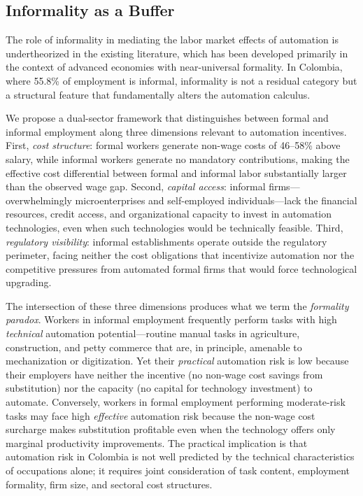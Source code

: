 \documentclass{article}
\begin{document}
\subsection{Informality as a Buffer}
\label{subsec:informality_theory}

The role of informality in mediating the labor market effects of automation is undertheorized in the existing literature, which has been developed primarily in the context of advanced economies with near-universal formality. In Colombia, where 55.8\% of employment is informal, informality is not a residual category but a structural feature that fundamentally alters the automation calculus.

We propose a dual-sector framework that distinguishes between formal and informal employment along three dimensions relevant to automation incentives. First, \textit{cost structure}: formal workers generate non-wage costs of 46--58\% above salary, while informal workers generate no mandatory contributions, making the effective cost differential between formal and informal labor substantially larger than the observed wage gap. Second, \textit{capital access}: informal firms---overwhelmingly microenterprises and self-employed individuals---lack the financial resources, credit access, and organizational capacity to invest in automation technologies, even when such technologies would be technically feasible. Third, \textit{regulatory visibility}: informal establishments operate outside the regulatory perimeter, facing neither the cost obligations that incentivize automation nor the competitive pressures from automated formal firms that would force technological upgrading.

The intersection of these three dimensions produces what we term the \textit{formality paradox}. Workers in informal employment frequently perform tasks with high \textit{technical} automation potential---routine manual tasks in agriculture, construction, and petty commerce that are, in principle, amenable to mechanization or digitization. Yet their \textit{practical} automation risk is low because their employers have neither the incentive (no non-wage cost savings from substitution) nor the capacity (no capital for technology investment) to automate. Conversely, workers in formal employment performing moderate-risk tasks may face high \textit{effective} automation risk because the non-wage cost surcharge makes substitution profitable even when the technology offers only marginal productivity improvements. The practical implication is that automation risk in Colombia is not well predicted by the technical characteristics of occupations alone; it requires joint consideration of task content, employment formality, firm size, and sectoral cost structures.
\end{document}
